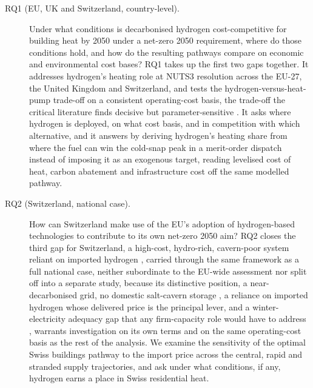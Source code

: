 \begin{description}
  \item[RQ1 (EU, UK and Switzerland, country-level).] Under what conditions is
  decarbonised hydrogen cost-competitive for building heat by 2050 under a net-zero
  2050 requirement, where do those conditions hold, and how do the resulting pathways
  compare on economic and environmental cost bases? RQ1 takes up the first two gaps together. It addresses hydrogen's heating role at NUTS3 resolution across the EU-27, the United Kingdom
  and Switzerland, and tests the hydrogen-versus-heat-pump trade-off on a
  consistent operating-cost basis, the trade-off the critical literature finds
  decisive but parameter-sensitive \citep{Rosenow2022PipeDream,ICCT2023h2heating}. It asks where hydrogen is deployed, on what cost basis, and in competition with which alternative, and it answers by
  deriving hydrogen's heating share from where the fuel can win the cold-snap peak
  in a merit-order dispatch instead of imposing it as an exogenous target, reading
  levelised cost of heat, carbon abatement and infrastructure cost off the same
  modelled pathway.

  \item[RQ2 (Switzerland, national case).] How can Switzerland make use of the EU's
  adoption of hydrogen-based technologies to contribute to its own net-zero 2050
  aim? RQ2 closes the third gap for Switzerland, a high-cost, hydro-rich, cavern-poor system
reliant on imported hydrogen \citep{Gabrielli2020,IEA2023switzerland}, carried through the same framework as a
  full national case, neither subordinate to the EU-wide assessment nor split off
  into a separate study, because its distinctive position, a near-decarbonised
  grid, no domestic salt-cavern storage \citep{Caglayan2020caverns}, a reliance on
  imported hydrogen whose delivered price is the principal lever, and a
  winter-electricity adequacy gap that any firm-capacity role would have to address
  \citep{Mellot2024Mitigating}, warrants investigation on its own terms and on the
  same operating-cost basis as the rest of the analysis. We examine the sensitivity
  of the optimal Swiss buildings pathway to the import price across the central,
  rapid and stranded supply trajectories, and ask under what conditions, if any,
  hydrogen earns a place in Swiss residential heat.


\end{description}
